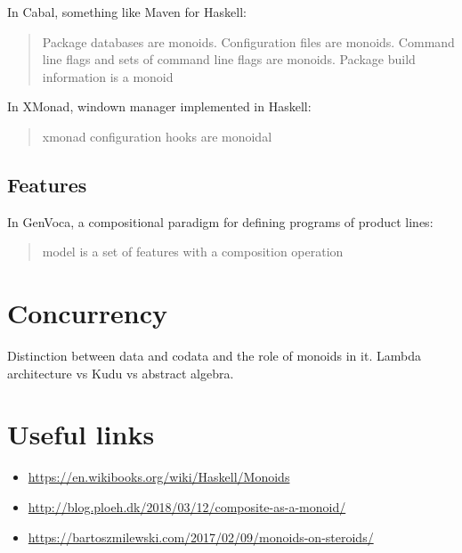 \documentclass{article}
\begin{document}
    In Cabal, something like Maven for Haskell: 

    \blockquote{Package databases are monoids. Configuration files are monoids. Command line flags and sets of command line flags are monoids. Package build information is a monoid}

    In XMonad, windown manager implemented in Haskell:

    \blockquote{xmonad configuration hooks are monoidal}

    \subsection{Features}

    In GenVoca, a compositional paradigm for defining programs of product lines:

    \blockquote{model is a set of features with a composition operation}

    \section{Concurrency}

    Distinction between data and codata and the role of monoids in it.
    Lambda architecture vs Kudu vs abstract algebra.

    \newpage

    \section{Useful links}

    \begin{itemize}
        \item \url{https://en.wikibooks.org/wiki/Haskell/Monoids}
        \item \url{http://blog.ploeh.dk/2018/03/12/composite-as-a-monoid/}
        \item \url{https://bartoszmilewski.com/2017/02/09/monoids-on-steroids/}
    \end{itemize}
\end{document}
